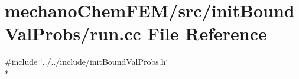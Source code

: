 \section{mechano\-Chem\-F\-E\-M/src/init\-Bound\-Val\-Probs/run.cc File Reference}
\label{run_8cc}
{\ttfamily \#include \char`\"{}../../include/init\-Bound\-Val\-Probs.\-h\char`\"{}}\\*
